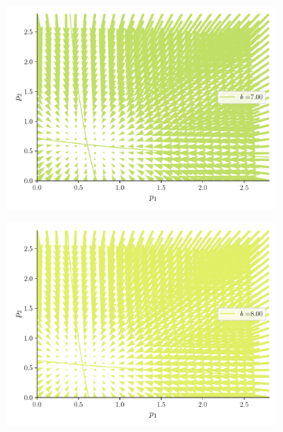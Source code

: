 \documentclass[twocolumn,aps,prl]{revtex4-1}
\begin{document}
\begin{figure}[ht!]
\begin{subfigure}[b]{0.49\linewidth}
      \includegraphics[width = 0.999\textwidth]{figuras/ex02-cosa3-6.pdf}
  \end{subfigure}\quad
  \begin{subfigure}[b]{0.49\linewidth}
      \centering
      \includegraphics[width = 0.999\textwidth]{figuras/ex02-cosa3-7.pdf}
  \end{subfigure}\quad
  \caption{}
  \label{fig:figuras/ex02-cosa3}
\end{figure}


% 
\end{document}
